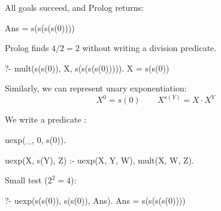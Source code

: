 All goals succeed, and Prolog returns:
\begin{codeblock}
Ans = s(s(s(s(0))))
\end{codeblock}


\begin{example}{}
Prolog finds $4/2=2$ without writing a division predicate.
\begin{codeblock}
?- mult(s(s(0)), X, s(s(s(s(0))))).
X = s(s(0))
\end{codeblock}
    
\end{example}

Similarly, we can represent unary exponentiation:
\[
X^0 = s(0) \qquad X^{s(Y)} = X \cdot X^Y
\]


We write a predicate :

\begin{codeblock}
uexp(_, 0, s(0)).

uexp(X, s(Y), Z) :-
    uexp(X, Y, W),
    mult(X, W, Z).
\end{codeblock}

Small test ($2^2 = 4$):
\begin{codeblock}
?- uexp(s(s(0)), s(s(0)), Ans).
Ans = s(s(s(s(0))))
\end{codeblock}